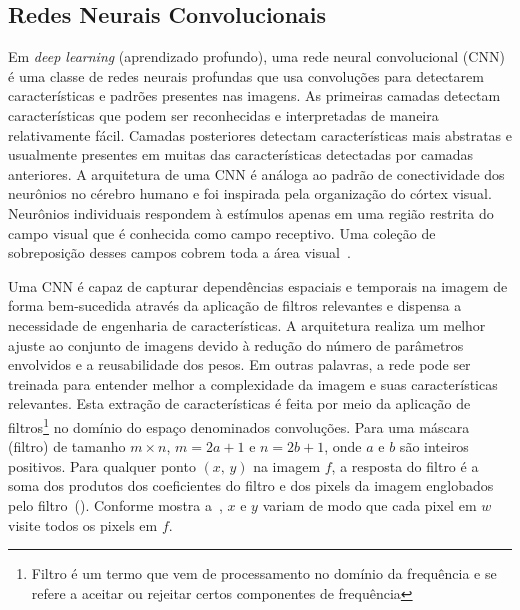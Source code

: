 \subsection{Redes Neurais Convolucionais}
Em \textit{deep learning} (aprendizado profundo), uma rede neural convolucional (\acrshort{CNN})~\cite{lecun2010convolutional} é uma classe de redes neurais profundas que usa convoluções para detectarem características e padrões presentes nas imagens. As primeiras camadas detectam características que podem ser reconhecidas e interpretadas de maneira relativamente fácil. Camadas posteriores detectam características mais abstratas e usualmente presentes em muitas das características detectadas por camadas anteriores. A arquitetura de uma \acrshort{CNN} é análoga ao padrão de conectividade dos neurônios no cérebro humano e foi inspirada pela organização do córtex visual. Neurônios individuais respondem à estímulos apenas em uma região restrita do campo visual que é conhecida como campo receptivo. Uma coleção de sobreposição desses campos cobrem toda a área visual~\cite{livrodl}.


Uma \acrshort{CNN} é capaz de capturar dependências espaciais e temporais na imagem de forma bem-sucedida através da aplicação de filtros relevantes e dispensa a necessidade de engenharia de características. A arquitetura realiza um melhor ajuste ao conjunto de imagens devido à redução do número de parâmetros envolvidos e a reusabilidade dos pesos. Em outras palavras, a rede pode ser treinada para entender melhor a complexidade da imagem e suas características relevantes. Esta extração de características é feita por meio da aplicação de filtros\footnote{Filtro é um termo que vem de processamento no domínio da frequência e se refere a aceitar ou rejeitar certos componentes de frequência} no domínio do espaço denominados convoluções. Para uma máscara (filtro) de tamanho $m \times n$, $m = 2a + 1$ e $n = 2b + 1$, onde $a$ e $b$ são inteiros positivos. Para qualquer ponto $(x,\, y)$ na imagem $f$, a resposta do filtro é a soma dos produtos dos coeficientes do filtro e dos pixels da imagem englobados pelo filtro~().
Conforme mostra a~, $x$ e $y$ variam de modo que cada pixel em $w$ visite todos os pixels em $f$.
